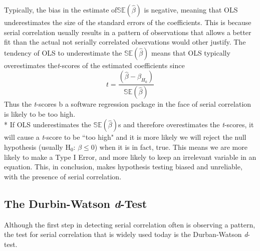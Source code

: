 \documentclass[11pt]{article}
\begin{document}
\begin{enumerate}
Typically, the bias in the estimate of$\mathbb{SE}(\hat{\beta})$ is negative, meaning that OLS underestimates the size of the standard errors of the coefficients. This is because serial correlation usually results in a pattern of observations that allows a better fit than the actual not serially correlated observations would other justify. The tendency of OLS to underestimate the $\mathbb{SE}(\hat{\beta})$ means that OLS typically overestimates the\textit{t}-scores of the estimated coefficients since
\begin{equation}
t=\frac{(\hat{\beta} -\beta_{H_0})}{\mathbb{SE}(\hat{\beta})}
\end{equation}
Thus the \textit{t}-scores b a software regression package in the face of serial correlation is likely to be too high. \\*
If OLS underestimates the $\mathbb{SE}(\hat{\beta})$s and therefore overestimates the \textit{t}-scores, it will cause a \textit{t}-score to be ``too high" and it is more likely we will reject the null hypothesis (usually $\text{H}_0\text{: }\beta \leq 0$) when it is in fact, true. This means we are more likely to make a Type I Error, and more likely to keep an irrelevant variable in an equation. This, in conclusion, makes hypothesis testing biased and unreliable, with the presence of serial correlation.
\end{enumerate}
\subsection{The Durbin-Watson \textit{d}-Test}
Although the first step in detecting serial correlation often is observing a pattern, the test for serial correlation that is widely used today is the Durban-Watson \textit{d}-test.
\end{document}
